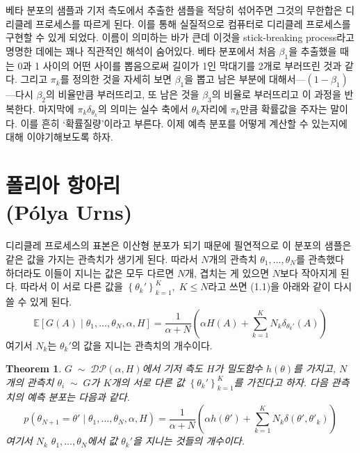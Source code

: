 \documentclass[a4paper, 10pt]{book}
\newtheorem{thm}{Theorem}[section]
\begin{document}
  베타 분포의 샘플과 기저 측도에서 추출한 샘플을 적당히 섞어주면 그것의 무한합은 디리클레 프로세스를 따르게 된다. 이를 통해 실질적으로 컴퓨터로 디리클레 프로세스를 구현할 수 있게 되었다. 이름이 의미하는 바가 큰데 이것을 stick-breaking process라고 명명한 데에는 꽤나 직관적인 해석이 숨어있다. 베타 분포에서 처음 $\beta_{1}$을 추출했을 때는 0과 1 사이의 어떤 사이를 뽑음으로써 길이가 1인 막대기를 2개로 부러뜨린 것과 같다. 그리고 $\pi_{k}$를 정의한 것을 자세히 보면 $\beta_{1}$을 뽑고 남은 부분에 대해서---$\left(1-\beta_{1}\right)$---다시 $\beta_{2}$의 비율만큼 부러뜨리고, 또 남은 것을 $\beta_{3}$의 비율로 부러뜨리고 이 과정을 반복한다. 마지막에 $\pi_{k}\delta_{\theta_{k}}$의 의미는 실수 축에서 $\theta_{k}$자리에 $\pi_{k}$만큼 확률값을 주자는 말이다. 이를 흔히 `확률질량'이라고 부른다. 이제 예측 분포를 어떻게 계산할 수 있는지에 대해 이야기해보도록 하자.
\section{폴리아 항아리\\(Pólya Urns)}
  디리클레 프로세스의 표본은 이산형 분포가 되기 때문에 필연적으로 이 분포의 샘플은 같은 값을 가지는 관측치가 생기게 된다. 따라서 $N$개의 관측치 $\theta_{1},\ldots , \theta_{N}$를 관측했다 하더라도 이들이 지니는 값은 모두 다르면 $N$개, 겹치는 게 있으면 $N$보다 작아지게 된다. 따라서 이 서로 다른 값을 $\left\{\theta_{k}'\right\}_{k=1}^{K},\; K\leq N$라고 쓰면 (1.1)을 아래와 같이 다시 쓸 수 있게 된다.
  $$
    \mathbb{E}\left[G\left(A\right)\;|\;\theta_{1},\ldots , \theta_{N},\alpha, H\right] = \frac{1}{\alpha+N}\left(\alpha H\left(A\right)+\sum_{k=1}^{K}N_{k}\delta_{\theta_{k}'}\left(A\right)\right)
  $$
  여기서 $N_{k}$는 $\theta_{k}'$의 값을 지니는 관측치의 개수이다.
  \begin{thm}
    $G\;\sim\;\mathcal{DP}\left(\alpha, H\right)$에서 기저 측도 $H$가 밀도함수 $h\left(\theta\right)$를 가지고, $N$개의 관측치 $\theta_{i}\;\sim\; G$가 $K$개의 서로 다른 값 $\left\{\theta_{k}'\right\}_{k=1}^{K}$를 가진다고 하자. 다음 관측치의 예측 분포는 다음과 같다.
    \begin{equation}
      p\left(\theta_{N+1}=\theta' \;|\; \theta_{1},\ldots , \theta_{N},\alpha, H\right)=\frac{1}{\alpha+N}\left(\alpha h\left(\theta'\right)+\sum_{k=1}^{K}N_{k}\delta\left(\theta',\theta'_{k}\right)\right)
    \end{equation}
    여기서 $N_{k}$ $\theta_{1},\ldots , \theta_{N}$에서 값 $\theta_{k}'$을 지니는 것들의 개수이다.
  \end{thm}
  
\end{document}
